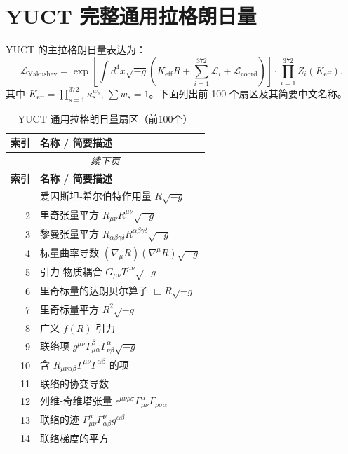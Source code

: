 \documentclass[11pt,a4paper]{article}
\begin{document}
	\section{YUCT 完整通用拉格朗日量}
	YUCT 的主拉格朗日量表达为：
	\begin{equation}
		\mathcal{L}_{\text{Yakushev}} = \exp\left[\int d^4x\sqrt{-g}\left(K_{\mathrm{eff}}R + \sum_{i=1}^{372}\mathcal{L}_i + \mathcal{L}_{\text{coord}}\right)\right] \cdot \prod_{i=1}^{372} Z_i(K_{\mathrm{eff}}),
	\end{equation}
	其中 \(K_{\mathrm{eff}} = \prod_{s=1}^{372} \kappa_s^{w_s}\), \(\sum w_s = 1\)。下面列出前 100 个扇区及其简要中文名称。
	\scriptsize
	\begin{longtable}{r l}
		\caption{YUCT 通用拉格朗日量扇区（前100个）}\label{tab:sectors}\\
		\toprule
		\textbf{索引} & \textbf{名称 / 简要描述} \\
		\midrule
		\endfirsthead
		\multicolumn{2}{c}{\textit{续下页}}\\
		\toprule
		\textbf{索引} & \textbf{名称 / 简要描述} \\
		\midrule
		\endhead
		\bottomrule
		\endfoot
		1 & 爱因斯坦‑希尔伯特作用量 \(R\sqrt{-g}\) \\
		2 & 里奇张量平方 \(R_{\mu\nu}R^{\mu\nu}\sqrt{-g}\) \\
		3 & 黎曼张量平方 \(R_{\alpha\beta\gamma\delta}R^{\alpha\beta\gamma\delta}\sqrt{-g}\) \\
		4 & 标量曲率导数 \((\nabla_\mu R)(\nabla^\mu R)\sqrt{-g}\) \\
		5 & 引力‑物质耦合 \(G_{\mu\nu}T^{\mu\nu}\sqrt{-g}\) \\
		6 & 里奇标量的达朗贝尔算子 \(\Box R\sqrt{-g}\) \\
		7 & 里奇标量平方 \(R^2\sqrt{-g}\) \\
		8 & 广义 \(f(R)\) 引力 \\
		9 & 联络项 \(g^{\mu\nu}\Gamma^{\beta}_{\mu\alpha}\Gamma^{\alpha}_{\nu\beta}\sqrt{-g}\) \\
		10 & 含 \(R_{\mu\nu\alpha\beta}\Gamma^{\mu\nu}\Gamma^{\alpha\beta}\) 的项 \\
		11 & 联络的协变导数 \\
		12 & 列维‑奇维塔张量 \(\epsilon^{\mu\nu\rho\sigma}\Gamma^{\alpha}_{\mu\nu}\Gamma_{\rho\sigma\alpha}\) \\
		13 & 联络的迹 \(\Gamma^{\mu}_{\mu\nu}\Gamma^{\nu}_{\alpha\beta}g^{\alpha\beta}\) \\
		14 & 联络梯度的平方 \\

\end{longtable}
\end{document}
